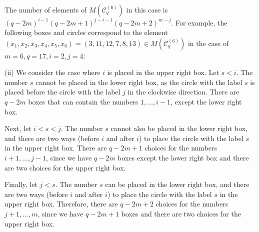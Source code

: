 \documentclass{article}
\theoremstyle{plain}
\theoremstyle{definition}
\theoremstyle{remark}
\numberwithin{equation}{section}
\newcommand{\Cc}{\mathcal{C}}
\begin{document}
The number of elements of $M(\Cc^{(6)}_q)$ in this case is $(q-2m)^{i-1}(q-2m+1)^{j-i-1}(q-2m+2)^{m-j}$.
For example, the following boxes and circles correspond to the element $(x_1,x_2,x_3,x_4,x_5,x_6)=(3,11,12,7,8,13)\in M(\Cc^{(6)}_q)$ in the case of $m=6,q=17,i=2,j=4$:
\begin{center}
\end{center}


(i\hspace{-0.5mm}i) We consider the case where $i$ is placed in the upper right box.
Let $s<i$.
The number $s$ cannot be placed in the lower right box, as the circle with the label $s$ is placed before the circle with the label $j$ in the clockwise direction.
There are $q-2m$ boxes that can contain the numbers $1,\dots,i-1$, except the lower right box.

Next, let $i<s<j$.
The number $s$ cannot also be placed in the lower right box, and there are two ways (before $i$ and after $i$) to place the circle with the label $s$ in the upper right box.
There are $q-2m+1$ choices for the numbers $i+1,\dots,j-1$, since we have $q-2m$ boxes except the lower right box and there are two choices for the upper right box.

Finally, let $j<s$.
The number $s$ can be placed in the lower right box, and there are two ways (before $i$ and after $i$) to place the circle with the label $s$ in the upper right box.
Therefore, there are $q-2m+2$ choices for the numbers $j+1,\dots,m$, since we have $q-2m+1$ boxes and there are two choices for the upper right box.
\end{document}

